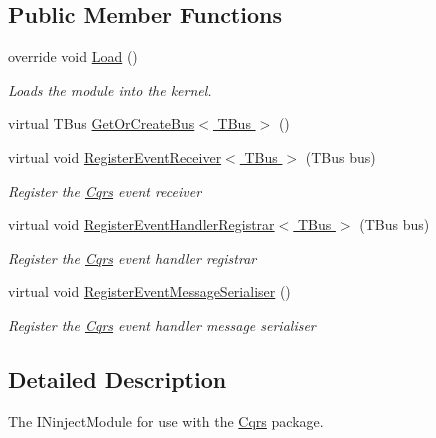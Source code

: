 \subsection*{Public Member Functions}
\begin{DoxyCompactItemize}
\item 
override void \hyperlink{classCqrs_1_1Ninject_1_1Azure_1_1ServiceBus_1_1EventBus_1_1Configuration_1_1AzureEventBusReceiverModule_a806a400a3eec26d81ab200a425ef6121}{Load} ()
\begin{DoxyCompactList}\small\item\em Loads the module into the kernel. \end{DoxyCompactList}\item 
virtual T\+Bus \hyperlink{classCqrs_1_1Ninject_1_1Azure_1_1ServiceBus_1_1EventBus_1_1Configuration_1_1AzureEventBusReceiverModule_a421f5ac0599f0d3d5be569cc954be73b}{Get\+Or\+Create\+Bus$<$ T\+Bus $>$} ()
\item 
virtual void \hyperlink{classCqrs_1_1Ninject_1_1Azure_1_1ServiceBus_1_1EventBus_1_1Configuration_1_1AzureEventBusReceiverModule_a67b8ec2c2762bf04c0568bead3d03cbf}{Register\+Event\+Receiver$<$ T\+Bus $>$} (T\+Bus bus)
\begin{DoxyCompactList}\small\item\em Register the \hyperlink{namespaceCqrs}{Cqrs} event receiver \end{DoxyCompactList}\item 
virtual void \hyperlink{classCqrs_1_1Ninject_1_1Azure_1_1ServiceBus_1_1EventBus_1_1Configuration_1_1AzureEventBusReceiverModule_ab80bf02927363075fc0be6cd180a3398}{Register\+Event\+Handler\+Registrar$<$ T\+Bus $>$} (T\+Bus bus)
\begin{DoxyCompactList}\small\item\em Register the \hyperlink{namespaceCqrs}{Cqrs} event handler registrar \end{DoxyCompactList}\item 
virtual void \hyperlink{classCqrs_1_1Ninject_1_1Azure_1_1ServiceBus_1_1EventBus_1_1Configuration_1_1AzureEventBusReceiverModule_a240eed04165b4f23ca27aee357d44b28}{Register\+Event\+Message\+Serialiser} ()
\begin{DoxyCompactList}\small\item\em Register the \hyperlink{namespaceCqrs}{Cqrs} event handler message serialiser \end{DoxyCompactList}\end{DoxyCompactItemize}


\subsection{Detailed Description}
The I\+Ninject\+Module for use with the \hyperlink{namespaceCqrs}{Cqrs} package. 



